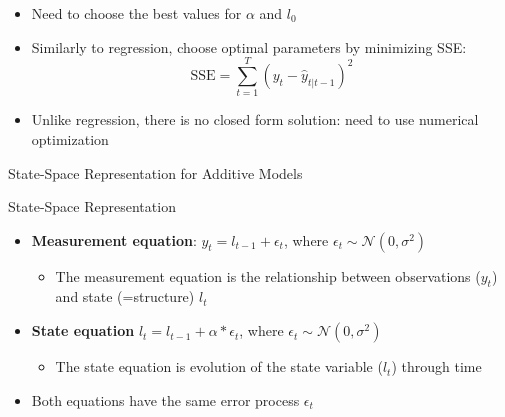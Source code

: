 \documentclass{beamer}
\begin{document}
\begin{frame}
  \begin{itemize}
  \item Need to choose the best values for $\alpha$ and $l_0$
  \item Similarly to regression, choose optimal parameters by minimizing SSE:
    \begin{equation*}
      \text{SSE} = \sum_{t=1}^T (y_t - \hat{y}_{t|t-1})^2
    \end{equation*}
  \item Unlike regression, there is no closed form solution: need to use numerical optimization
  \end{itemize}
\end{frame}


\begin{frame}{State-Space Representation for Additive Models}
  \begin{alertblock}{State-Space Representation}
    \begin{itemize}
    \item \textbf{Measurement equation}: $y_t = l_{t-1} + \epsilon_t$, where $\epsilon_t \sim \mathcal{N}(0, \sigma^2)$
      \begin{itemize}
      \item The measurement equation is the relationship between observations ($y_t$) and state (=structure) $l_t$
      \end{itemize}
    \item \textbf{State equation} $l_t = l_{t-1} + \alpha*\epsilon_t$, where $\epsilon_t \sim \mathcal{N}(0, \sigma^2)$
      \begin{itemize}
      \item The state equation is evolution of the state variable ($l_t$) through time
      \end{itemize}
     \end{itemize}
  \end{alertblock}


  \begin{itemize}
  \item Both equations have the same error process $\epsilon_t$
  \end{itemize}
  
\end{frame}
\end{document}
